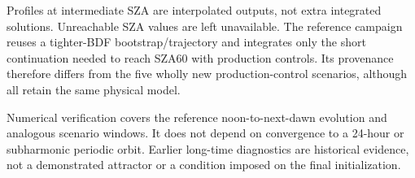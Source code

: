 Profiles at intermediate SZA are interpolated outputs, not extra integrated solutions. Unreachable SZA values are left unavailable. The reference campaign reuses a tighter-BDF bootstrap/trajectory and integrates only the short continuation needed to reach SZA60 with production controls. Its provenance therefore differs from the five wholly new production-control scenarios, although all retain the same physical model.

Numerical verification covers the reference noon-to-next-dawn evolution and analogous scenario windows. It does not depend on convergence to a 24-hour or subharmonic periodic orbit. Earlier long-time diagnostics are historical evidence, not a demonstrated attractor or a condition imposed on the final initialization.
